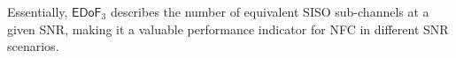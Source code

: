 \documentclass[journal]{IEEEtran}
\theoremstyle{definition}
\begin{document}
Essentially, ${\mathsf{EDoF}}_3$ describes the number of equivalent SISO sub-channels at a given SNR, making it a valuable performance indicator for NFC in different SNR scenarios.


\end{document}
